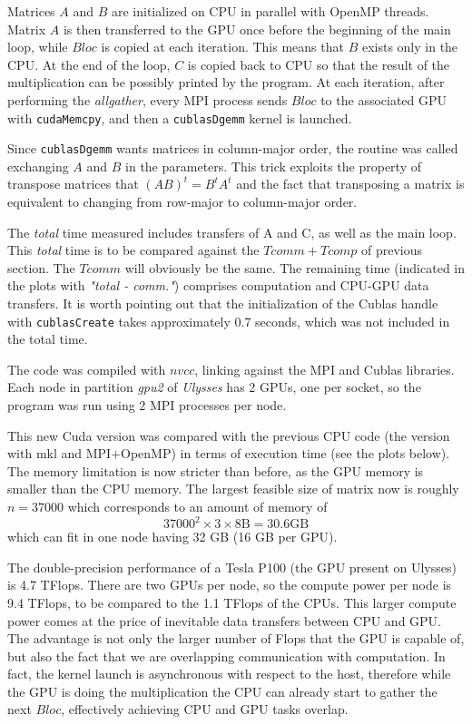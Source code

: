 \documentclass[12pt]{extarticle}
\begin{document}
Matrices $A$ and $B$ are initialized on CPU in parallel with OpenMP threads. Matrix $A$ is then transferred to the GPU once before the beginning of the main loop, while $Bloc$ is copied at each iteration. This means that $B$ exists only in the CPU. At the end of the loop, $C$ is copied back to CPU so that the result of the multiplication can be possibly printed by the program.
At each iteration, after performing the \textit{allgather}, every MPI process sends $Bloc$ to the associated GPU with \texttt{cudaMemcpy}, and then a \texttt{cublasDgemm} kernel is launched.

Since \texttt{cublasDgemm} wants matrices in column-major order, the routine was called exchanging $A$ and $B$ in the parameters. This trick exploits the property of transpose matrices that $(AB)^t = B^t A^t$ and the fact that transposing a matrix is equivalent to changing from row-major to column-major order.

The \textit{total} time measured includes transfers of A and C, as well as the main loop. This \textit{total} time is to be compared against the $Tcomm + Tcomp$ of previous section. The $Tcomm$ will obviously be the same. The remaining time (indicated in the plots with \textit{"total - comm."}) comprises computation and CPU-GPU data transfers.
It is worth pointing out that the initialization of the Cublas handle with \texttt{cublasCreate} takes approximately 0.7 seconds, which was not included in the total time.


The code was compiled with $nvcc$, linking against the MPI and Cublas libraries. Each node in partition \textit{gpu2} of \textit{Ulysses} has 2 GPUs, one per socket, so the program was run using 2 MPI processes per node.%

This new Cuda version was compared with the previous CPU code (the version with mkl and MPI+OpenMP) in terms of execution time (see the plots below).
The memory limitation is now stricter than before, as the GPU memory is smaller than the CPU memory. The largest feasible size of matrix now is roughly $n=37000$ which corresponds to an amount of memory of
\[ 37000^2 \times 3 \times 8\mathrm{B} = 30.6 \mathrm{GB} \]
which can fit in one node having 32 GB (16 GB per GPU).



The double-precision performance of a Tesla P100 (the GPU present on Ulysses) is 4.7 TFlops. There are two GPUs per node, so the compute power per node is 9.4 TFlops, to be compared to the 1.1 TFlops of the CPUs. This larger compute power comes at the price of inevitable data transfers between CPU and GPU.
The advantage is not only the larger number of Flops that the GPU is capable of, but also the fact that we are overlapping communication with computation. In fact, the kernel launch is asynchronous with respect to the host, therefore while the GPU is doing the multiplication the CPU can already start to gather the next $Bloc$, effectively achieving CPU and GPU tasks overlap.
\end{document}

